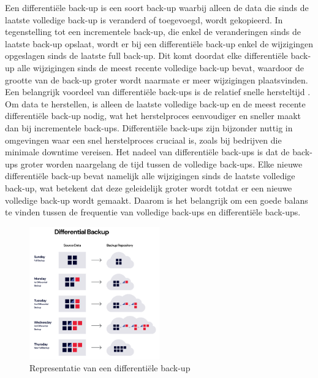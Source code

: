 Een differentiële back-up is een soort back-up waarbij alleen de data die sinds de laatste volledige back-up is veranderd of toegevoegd, wordt gekopieerd. In tegenstelling tot een incrementele back-up, die enkel de veranderingen sinds de laatste back-up opslaat, wordt er bij een differentiële back-up enkel de wijzigingen opgeslagen sinds de laatste full back-up. Dit komt doordat elke differentiële back-up alle wijzigingen sinds de meest recente volledige back-up bevat, waardoor de grootte van de back-up groter wordt naarmate er meer wijzigingen plaatsvinden. Een belangrijk voordeel van differentiële back-ups is de relatief snelle hersteltijd \autocite{Beard2018}. Om data te herstellen, is alleen de laatste volledige back-up en de meest recente differentiële back-up nodig, wat het herstelproces eenvoudiger en sneller maakt dan bij incrementele back-ups. Differentiële back-ups zijn bijzonder nuttig in omgevingen waar een snel herstelproces cruciaal is, zoals bij bedrijven die minimale downtime vereisen. Het nadeel van differentiële back-ups is dat de back-ups groter worden naargelang de tijd tussen de volledige back-ups. Elke nieuwe differentiële back-up bevat namelijk alle wijzigingen sinds de laatste volledige back-up, wat betekent dat deze geleidelijk groter wordt totdat er een nieuwe volledige back-up wordt gemaakt. Daarom is het belangrijk om een goede balans te vinden tussen de frequentie van volledige back-ups en differentiële back-ups.
 \begin{figure}[h]
     \centering
     \includegraphics[width=0.5\textwidth]{img/diff.png}  
     \caption{Representatie van een differentiële back-up \autocite{Rivas2022}}   
     \label{fig:diffrback-up}           
 \end{figure}

